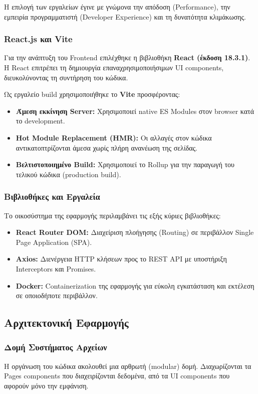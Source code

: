 \documentclass[a4paper,12pt]{article}
\begin{document}
Η επιλογή των εργαλείων έγινε με γνώμονα την απόδοση (Performance), την εμπειρία προγραμματιστή (Developer Experience) και τη δυνατότητα κλιμάκωσης.

\subsubsection{React.js και Vite}
Για την ανάπτυξη του Frontend επιλέχθηκε η βιβλιοθήκη \textbf{React (έκδοση 18.3.1)}. Η React επιτρέπει τη δημιουργία επαναχρησιμοποιήσιμων UI components, διευκολύνοντας τη συντήρηση του κώδικα. 

Ως εργαλείο build χρησιμοποιήθηκε το \textbf{Vite} προσφέροντας:
\begin{itemize}
    \item \textbf{Άμεση εκκίνηση Server:} Χρησιμοποιεί native ES Modules στον browser κατά το development.
    \item \textbf{Hot Module Replacement (HMR):} Οι αλλαγές στον κώδικα αντικατοπτρίζονται άμεσα χωρίς πλήρη ανανέωση της σελίδας.
    \item \textbf{Βελτιστοποιημένο Build:} Χρησιμοποιεί το Rollup για την παραγωγή του τελικού κώδικα (production build).
\end{itemize}

\subsubsection{Βιβλιοθήκες και Εργαλεία}
Το οικοσύστημα της εφαρμογής περιλαμβάνει τις εξής κύριες βιβλιοθήκες:
\begin{itemize}
    \item \textbf{React Router DOM:} Διαχείριση πλοήγησης (Routing) σε περιβάλλον Single Page Application (SPA).
    \item \textbf{Axios:} Διενέργεια HTTP κλήσεων προς το REST API με υποστήριξη Interceptors και Promises.
    \item \textbf{Docker:} Containerization της εφαρμογής για εύκολη εγκατάσταση και εκτέλεση σε οποιοδήποτε περιβάλλον.
\end{itemize}

\subsection{Αρχιτεκτονική Εφαρμογής}

\subsubsection{Δομή Συστήματος Αρχείων}
Η οργάνωση του κώδικα ακολουθεί μια αρθρωτή (modular) δομή. Διαχωρίζονται τα Pages components που διαχειρίζονται δεδομένα, από τα UI components που αφορούν μόνο την εμφάνιση.
\end{document}

